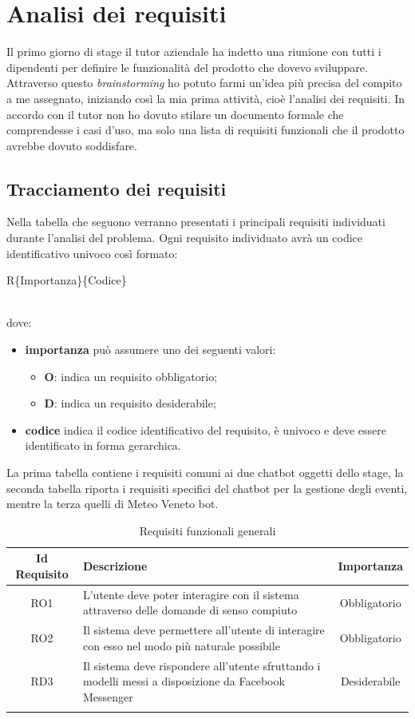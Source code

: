 
\chapter{Analisi dei requisiti}
\label{cap:analisi}

Il primo giorno di stage il tutor aziendale ha indetto una riunione con tutti i dipendenti per definire le funzionalità del prodotto che dovevo sviluppare. Attraverso questo \emph{brainstorming} ho potuto farmi un'idea più precisa del compito a me assegnato, iniziando così la mia prima attività, cioè l'analisi dei requisiti. In accordo con il tutor non ho dovuto stilare un documento formale che comprendesse i casi d'uso, ma solo una lista di requisiti funzionali che il prodotto avrebbe dovuto soddisfare.

\section{Tracciamento dei requisiti}
Nella tabella che seguono verranno presentati i principali requisiti individuati durante l’analisi del problema.
Ogni requisito individuato avrà un codice identificativo univoco così formato: \\
\centerline{R\{Importanza\}\{Codice\}} \\ 
dove:
\begin{itemize}
	\item \textbf{importanza} può assumere uno dei seguenti valori:
	\begin{itemize}
		\item \textbf{O}: indica un requisito obbligatorio;
		\item \textbf{D}: indica un requisito desiderabile;
	\end{itemize}
	\item \textbf{codice} indica il codice identificativo del requisito, è univoco e deve essere
identificato in forma gerarchica.
\end{itemize}

La prima tabella contiene i requisiti comuni ai due \gls{chatbot} oggetti dello stage, la seconda tabella riporta i requisiti specifici del \gls{chatbot} per la gestione degli eventi, mentre la terza quelli di Meteo Veneto bot.

\normalsize
\begin{longtable}{|c|>{\centering}m{7cm}|c|}
\hline
\textbf{Id Requisito} & \textbf{Descrizione} & \textbf{Importanza}\\
\hline
\endhead
RO1 & L'utente deve poter interagire con il sistema attraverso delle domande di senso compiuto & Obbligatorio\\ 
RO2 & Il sistema deve permettere all'utente di interagire con esso nel modo più naturale possibile & Obbligatorio \\
RD3 & Il sistema deve rispondere all'utente sfruttando i modelli messi a disposizione da Facebook Messenger & Desiderabile\\
\hline
\caption{Requisiti funzionali generali}
\end{longtable}

